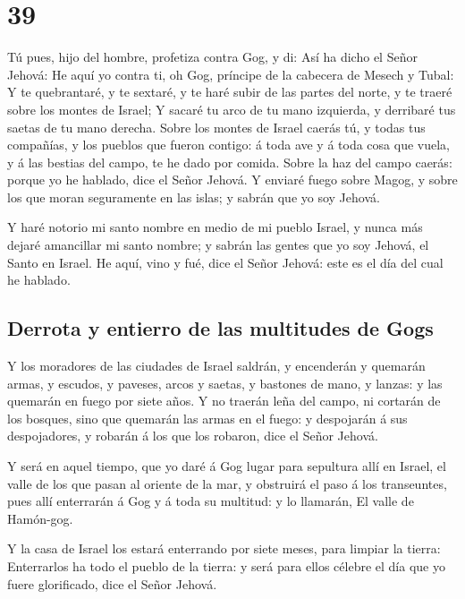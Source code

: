 \hypertarget{section-38}{%
\section{39}\label{section-38}}

 Tú pues, hijo del hombre, profetiza contra Gog, y di: Así
ha dicho el Señor Jehová: He aquí yo contra ti, oh Gog, príncipe de la
cabecera de Mesech y Tubal:  Y te quebrantaré, y te
sextaré, y te haré subir de las partes del norte, y te traeré sobre los
montes de Israel;  Y sacaré tu arco de tu mano izquierda,
y derribaré tus saetas de tu mano derecha.  Sobre los
montes de Israel caerás tú, y todas tus compañías, y los pueblos que
fueron contigo: á toda ave y á toda cosa que vuela, y á las bestias del
campo, te he dado por comida.  Sobre la haz del campo
caerás: porque yo he hablado, dice el Señor Jehová.  Y
enviaré fuego sobre Magog, y sobre los que moran seguramente en las
islas; y sabrán que yo soy Jehová.

 Y haré notorio mi santo nombre en medio de mi pueblo
Israel, y nunca más dejaré amancillar mi santo nombre; y sabrán las
gentes que yo soy Jehová, el Santo en Israel.  He aquí,
vino y fué, dice el Señor Jehová: este es el día del cual he hablado.

\hypertarget{derrota-y-entierro-de-las-multitudes-de-gogs}{%
\subsection{Derrota y entierro de las multitudes de
Gogs}\label{derrota-y-entierro-de-las-multitudes-de-gogs}}

 Y los moradores de las ciudades de Israel saldrán, y
encenderán y quemarán armas, y escudos, y paveses, arcos y saetas, y
bastones de mano, y lanzas: y las quemarán en fuego por siete años.
 Y no traerán leña del campo, ni cortarán de los bosques,
sino que quemarán las armas en el fuego: y despojarán á sus
despojadores, y robarán á los que los robaron, dice el Señor Jehová.

 Y será en aquel tiempo, que yo daré á Gog lugar para
sepultura allí en Israel, el valle de los que pasan al oriente de la
mar, y obstruirá el paso á los transeuntes, pues allí enterrarán á Gog y
á toda su multitud: y lo llamarán, El valle de Hamón-gog.

 Y la casa de Israel los estará enterrando por siete
meses, para limpiar la tierra:  Enterrarlos ha todo el
pueblo de la tierra: y será para ellos célebre el día que yo fuere
glorificado, dice el Señor Jehová.

